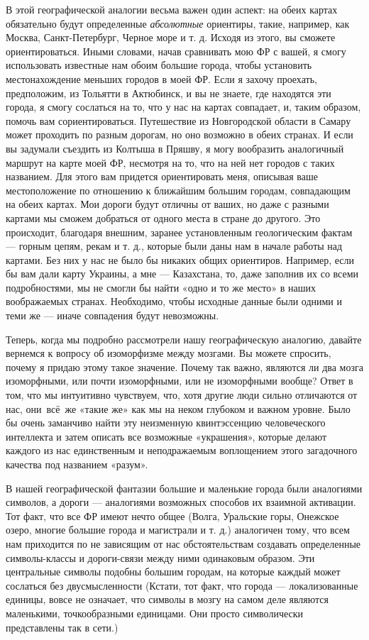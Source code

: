 \documentclass[../main.tex]{subfiles}
\begin{document}
В этой географической аналогии весьма важен один аспект: на обеих картах обязательно будут определенные \emph{абсолютные} ориентиры, такие, например, как Москва, Санкт-Петербург, Черное море и т. д. Исходя из этого, вы сможете ориентироваться. Иными словами, начав сравнивать мою ФР с вашей, я смогу использовать известные нам обоим большие города, чтобы установить местонахождение меньших городов в моей ФР. Если я захочу проехать, предположим, из Тольятти в Актюбинск, и вы не знаете, где находятся эти города, я смогу сослаться на то, что у нас на картах совпадает, и, таким образом, помочь вам сориентироваться. Путешествие из Новгородской области в Самару может проходить по разным дорогам, но оно возможно в обеих странах. И если вы задумали съездить из Колтыша в Пряшву, я могу вообразить аналогичный маршрут на карте моей ФР, несмотря на то, что на ней нет городов с таких названием. Для этого вам придется ориентировать меня, описывая ваше местоположение по отношению к ближайшим большим городам, совпадающим на обеих картах. Мои дороги будут отличны от ваших, но даже с разными картами мы сможем добраться от одного места в стране до другого. Это происходит, благодаря внешним, заранее установленным геологическим фактам --- горным цепям, рекам и т. д., которые были даны нам в начале работы над картами. Без них у нас не было бы никаких общих ориентиров. Например, если бы вам дали карту Украины, а мне --- Казахстана, то, даже заполнив их со всеми подробностями, мы не смогли бы найти «одно и то же место» в наших воображаемых странах. Необходимо, чтобы исходные данные были одними и теми же --- иначе совпадения будут невозможны.

Теперь, когда мы подробно рассмотрели нашу географическую аналогию, давайте вернемся к вопросу об изоморфизме между мозгами. Вы можете спросить, почему я придаю этому такое значение. Почему так важно, являются ли два мозга изоморфными, или почти изоморфными, или не изоморфными вообще? Ответ в том, что мы интуитивно чувствуем, что, хотя другие люди сильно отличаются от нас, они~всё~же «такие же» как мы на неком глубоком и важном уровне. Было бы очень заманчиво найти эту неизменную квинтэссенцию человеческого интеллекта и затем описать все возможные «украшения», которые делают каждого из нас единственным и неподражаемым воплощением этого загадочного качества под названием «разум».

В нашей географической фантазии большие и маленькие города были аналогиями символов, а дороги --- аналогиями возможных способов их взаимной активации. Тот факт, что все ФР имеют нечто общее (Волга, Уральские горы, Онежское озеро, многие большие города и магистрали и т. д.) аналогичен тому, что всем нам приходится по не зависящим от нас обстоятельствам создавать определенные символы-классы и дороги-связи между ними одинаковым образом. Эти центральные символы подобны большим городам, на которые каждый может сослаться без двусмысленности (Кстати, тот факт, что города --- локализованные единицы, вовсе не означает, что символы в мозгу на самом деле являются маленькими, точкообразными единицами. Они просто символически представлены так в сети.)
\end{document}
